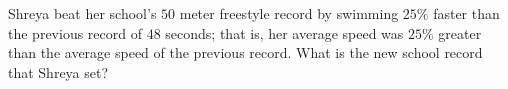 Shreya beat her school's $50$ meter freestyle record by swimming $25\%$ faster than the previous record of $48$ seconds; that is, her average speed was $25\%$ greater than the average speed of the previous record. What is the new school record that Shreya set?
